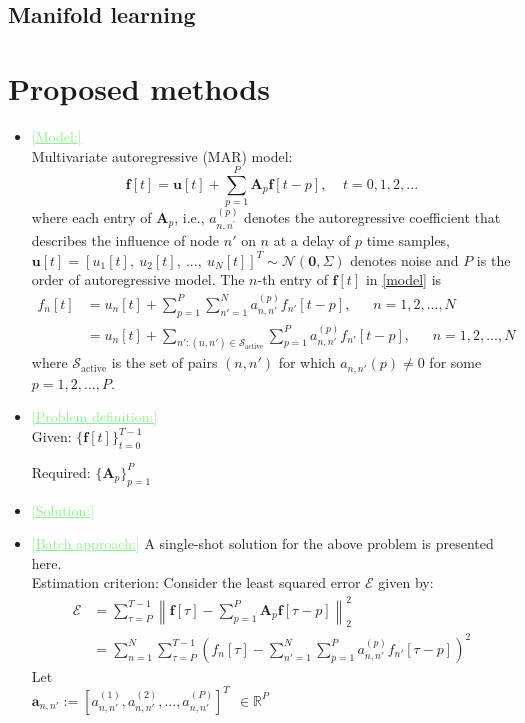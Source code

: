 \documentclass[11pt,final,onecolumn]{IEEEtran}
\newcommand{\cmt}[1]{\noindent\textcolor{lightgreen}{\underline{[#1]}}} %
\newcommand{\cmt}[1]{} %
\begin{document}
\subsection{Manifold learning}

\section{Proposed methods}
 \begin{itemize}
	\item\cmt{Model:}\\
Multivariate autoregressive (MAR) model:
\begin{equation}\label{model}
\bm f[t]=\bm u[t]+\sum_{p=1}^{P}\mathbf A_p \bm f[t-p],~~~~~t=0,1,2,...
\end{equation}
where each entry of $\bm A_p$, i.e., $a_{n,n^{\prime}}^{(p)}$ denotes the autoregressive coefficient that describes the influence of node $n'$  on $n$ at a delay of $p$ time samples, $\bm u[t]=\left [ u_1[t],~ u_2[t],~ ..., ~u_N[t]\right ]^T \sim  \mathcal{N}(\bm 0,\Sigma)$ denotes noise and $P$ is the order of autoregressive model. The $n$-th entry of $\bm f[t]$ in \eqref{model} is 
\begin{align}
f_n[t]&=u_n[t]+\sum_{p=1}^P\sum_{n'=1}^{N}a_{n,n'}^{(p)}f_{n'}[t-p], ~~~~~~~ n=1,2, ..., N\\
&=u_n[t]+\sum_{n':(n,n')\in \mathcal S_{\text{active}}}\sum_{p=1}^{P}a_{n,n'}^{(p)}f_{n'}[t-p], ~~~~~~~ n=1,2, ..., N
\end{align}
where $\mathcal{S}_{\text{active}}$ is the set of pairs $(n,n')$ for which $a_{n,n'}(p) \neq 0$ for some $p=1,2,..., P$.
\item \cmt {Problem definition:}\\
Given: $\{\bm f[t]\}_{t=0}^{T-1}$

Required: $\{ \bm A_p\}_{p=1}^P$   
\item \cmt{Solution:}\\
\item \cmt{Batch approach:} A single-shot solution for the above problem is presented here.\\

Estimation criterion: Consider the least squared error $\mathcal{E}$ given by:
\begin{align}\label{key}
\mathcal{E}&= \sum_{\tau=P}^{T-1}\left \lVert \bm f[\tau]-\sum_{p=1}^{P} \bm A_p \bm f[\tau -p]\right \lVert_2^2\\ 
&=\sum_{n=1}^{N}\sum_{\tau=P}^{T-1}\left ( f_n[\tau]-\sum_{n'=1}^{N}\sum_{p=1}^{P} a_{n,n'}^{(p)} f_{n'}[\tau-p]\right )^2
\end{align}
 Let\\
$\bm a_{n,n'}:=[a_{n,n'}^{(1)},a_{n,n'}^{(2)},...,a_{n,n'}^{(P)}]^T ~~\in \mathbb R^ {P}$\\


\end{itemize}
\end{document}
